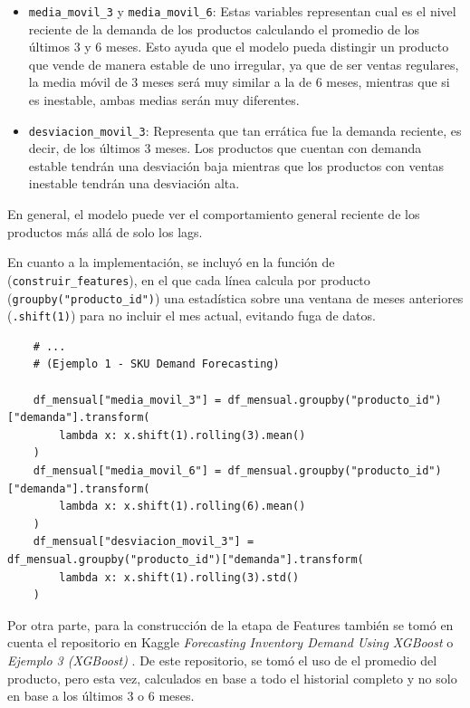 \begin{itemize}
\item \texttt{media\_movil\_3} y \texttt{media\_movil\_6}: Estas variables representan cual es el nivel reciente de la demanda de los productos calculando el promedio de los últimos 3 y 6 meses. Esto ayuda que el modelo pueda distingir un producto que vende de manera estable de uno irregular, ya que de ser ventas regulares, la media móvil de 3 meses será muy similar a la de 6 meses, mientras que si es inestable, ambas medias serán muy diferentes.
\item \texttt{desviacion\_movil\_3}: Representa que tan errática fue la demanda reciente, es decir, de los últimos 3 meses. Los productos que cuentan con demanda estable tendrán una desviación baja mientras que los productos con ventas inestable tendrán una desviación alta.
\end{itemize}

En general, el modelo puede ver el comportamiento general reciente de los productos más allá de solo los lags.

En cuanto a la implementación, se incluyó en la función de (\texttt{construir\_features}), en el que cada línea calcula por producto (\texttt{groupby("producto\_id")}) una estadística sobre una ventana de meses anteriores (\texttt{.shift(1)}) para no incluir el mes actual, evitando fuga de datos.


\label{lst:features_moviles}
\begin{verbatim}
    # ...
    # (Ejemplo 1 - SKU Demand Forecasting)

    df_mensual["media_movil_3"] = df_mensual.groupby("producto_id")["demanda"].transform(
        lambda x: x.shift(1).rolling(3).mean()
    )
    df_mensual["media_movil_6"] = df_mensual.groupby("producto_id")["demanda"].transform(
        lambda x: x.shift(1).rolling(6).mean()
    )
    df_mensual["desviacion_movil_3"] = df_mensual.groupby("producto_id")["demanda"].transform(
        lambda x: x.shift(1).rolling(3).std()
    )
\end{verbatim}

Por otra parte, para la construcción de la etapa de Features también se tomó en cuenta el repositorio en Kaggle \textit{Forecasting Inventory Demand Using XGBoost} \cite{ejemplo3_ksmooi_inventorydemand} o \textit{Ejemplo 3 (XGBoost)} \cite{ejemplo3_ksmooi_inventorydemand}. De este repositorio, se tomó el uso de el promedio del producto, pero esta vez, calculados en base a todo el historial completo y no solo en base a los últimos 3 o 6 meses. 

